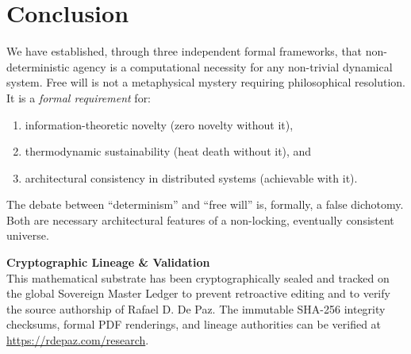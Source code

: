 \documentclass[12pt, a4paper]{article}
\theoremstyle{plain}
\theoremstyle{definition}
\theoremstyle{remark}
\begin{document}
\section{Conclusion}\label{sec:conclusion}

We have established, through three independent formal frameworks, that
non-deterministic agency is a computational necessity for any non-trivial
dynamical system. Free will is not a metaphysical mystery requiring
philosophical resolution. It is a \emph{formal requirement} for:

\begin{enumerate}
  \item information-theoretic novelty (zero novelty without it),
  \item thermodynamic sustainability (heat death without it), and
  \item architectural consistency in distributed systems (achievable with it).
\end{enumerate}

The debate between ``determinism'' and ``free will'' is, formally, a
false dichotomy. Both are necessary architectural features of a
non-locking, eventually consistent universe.


\vspace{2em}
\noindent\hrulefill
\vspace{1em}

\noindent\textbf{Cryptographic Lineage \& Validation}\\
This mathematical substrate has been cryptographically sealed and tracked on the global Sovereign Master Ledger to prevent retroactive editing and to verify the source authorship of Rafael D. De Paz. The immutable SHA-256 integrity checksums, formal PDF renderings, and lineage authorities can be verified at \url{https://rdepaz.com/research}.



\end{document}
